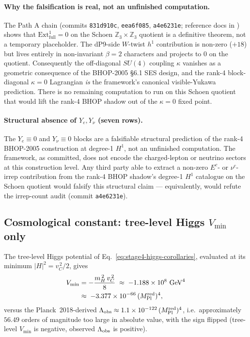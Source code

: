 ﻿\documentclass[reprint,amsmath,amssymb,aps,prd,longbibliography,floatfix]{revtex4-2}
\begin{document}
\paragraph{Why the falsification is real, not an unfinished computation.}
The Path A chain (commits \texttt{831d910c}, \texttt{eea6f085},
\texttt{a4e6231e}; reference docs in
)
shows that $\mathrm{Ext}^1_{\mathrm{full}} = 0$ on the Schoen
$\mathbb{Z}_3 \times \mathbb{Z}_3$ quotient is a definitive theorem,
not a temporary placeholder. The dP9-side $W$-twist $h^1$ contribution
is non-zero ($+18$) but lives entirely in non-invariant $\beta = 2$
characters and projects to $0$ on the quotient. Consequently the
off-diagonal $SU(4)$ coupling $\kappa$ vanishes as a geometric
consequence of the BHOP-2005 \S 6.1 SES design, and the rank-4
block-diagonal $\kappa = 0$ Lagrangian \emph{is} the framework's
canonical visible-Yukawa prediction. There is no remaining computation
to run on this Schoen quotient that would lift the rank-4 BHOP shadow
out of the $\kappa = 0$ fixed point.

\paragraph{Structural absence of $Y_e, Y_\nu$ (seven rows).}
The $Y_e \equiv 0$ and $Y_\nu \equiv 0$ blocks are a falsifiable
structural prediction of the rank-4 BHOP-2005 construction at degree-1
$H^1$, not an unfinished computation. The framework, as committed,
does not encode the charged-lepton or neutrino sectors at this
construction level. Any third party able to extract a non-zero
$E^c$- or $\nu^c$-irrep contribution from the rank-4 BHOP shadow's
degree-1 $H^1$ catalogue on the Schoen quotient would falsify this
structural claim --- equivalently, would refute the irrep-count
audit (commit \texttt{a4e6231e}).

\subsection{Cosmological constant: tree-level Higgs $V_{\min}$ only}
\label{subsec:stage4-lambda}

The tree-level Higgs potential of Eq.~\eqref{eq:stage4-higgs-corollaries},
evaluated at its minimum $|H|^2 = v_C^{\,2}/2$, gives
\begin{align*}
V_{\min} &= -\frac{m_H^{\,2}\,v_C^{\,2}}{8}
\;\approx\; -1.188 \times 10^{8}~\mathrm{GeV}^4 \\
&\approx\; -3.377 \times 10^{-66}\,(M_{\rm Pl}^{\rm red})^4,
\end{align*}
versus the Planck~2018-derived
$\Lambda_{\rm obs} \approx 1.1 \times 10^{-122}\,(M_{\rm Pl}^{\rm red})^4$,
i.e.\ approximately $56.49$ orders of magnitude too large in
absolute value, with the sign flipped (tree-level $V_{\min}$ is
negative, observed $\Lambda_{\rm obs}$ is positive).
\end{document}
